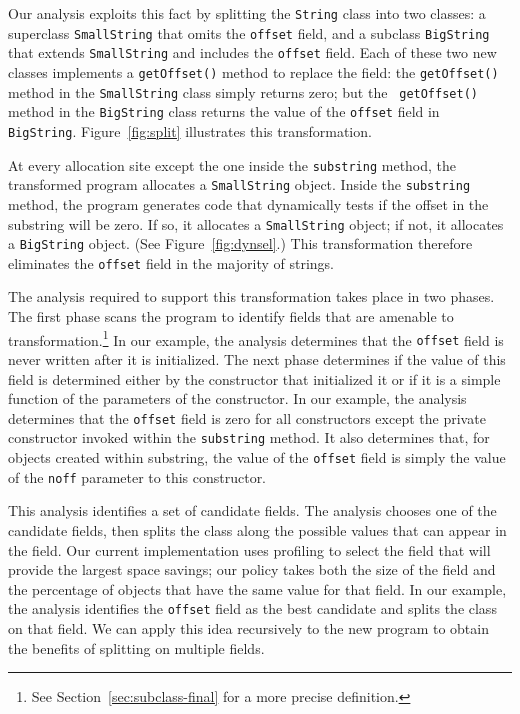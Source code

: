 \documentclass{acmconf}
\begin{document}
Our analysis exploits this fact by splitting the 
{\tt String} class into two classes: a superclass {\tt SmallString}
that omits the {\tt offset} field, and a subclass {\tt BigString} that
extends {\tt SmallString} and includes the {\tt offset} field. 
Each of these two new classes implements a {\tt getOffset()} method
to replace the field: the {\tt getOffset()} method
in the {\tt SmallString} class simply returns zero; but the {\tt
getOffset()} method in the {\tt BigString} class returns the 
value of the {\tt offset} field in {\tt BigString}.
Figure~\ref{fig:split} illustrates this transformation.

At every allocation site except the one inside the {\tt substring}
method, the transformed program allocates a {\tt SmallString} 
object. Inside the {\tt substring} method, the program generates
code that dynamically tests if the offset in the substring
will be zero. If so, it allocates a {\tt SmallString} object;
if not, it allocates a {\tt BigString} object.
(See Figure~\ref{fig:dynsel}.)
This transformation
therefore eliminates the {\tt offset} field in the majority
of strings. 

The analysis required to support this transformation takes place
in two phases. The first phase scans the program
to identify fields that
are amenable to transformation.\footnote{See
  Section~\ref{sec:subclass-final} for a more precise definition.}
In our example, the analysis
determines that the {\tt offset} field is never written after
it is initialized. The next phase determines if the value
of this field is determined either by the constructor that
initialized it or if it is a simple function of the parameters
of the constructor. In our example, the analysis determines
that the {\tt offset} field is zero for all constructors
except the private constructor invoked within the {\tt substring}
method. It also determines that, for objects created within substring,
the value of the {\tt offset} field is simply
the value of the {\tt noff} parameter to this constructor. 

This analysis identifies a set of candidate fields. 
The analysis chooses one of the candidate fields, then 
splits the class along the possible values
that can appear in the field. Our current implementation uses
profiling to select the field that will provide the largest
space savings; our policy takes both the size of the field
and the percentage of objects that have the same value for 
that field. In our example, the analysis identifies the 
{\tt offset} field as the best candidate and splits the class
on that field. We can apply this idea recursively to the 
new program to obtain the benefits of splitting on multiple
fields. 
\end{document}
